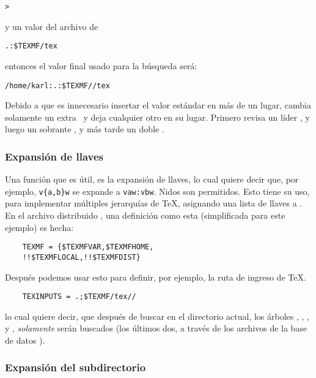 \documentclass{article}
\begin{document}
\begin{alltt}
	> 
\end{alltt}
y un valor  del archivo  de

\begin{alltt}
	.:\$TEXMF/tex
\end{alltt}
entonces el valor final usado para la búsqueda será:

\begin{alltt}
	/home/karl:.:\$TEXMF//tex
\end{alltt}

Debido a que es innecesario insertar el valor estándar en más
de un lugar, \KPS{} cambia solamente un extra \samp{:}\ y deja
cualquier otro en su lugar. Primero revisa un líder \samp{:},
y luego un sobrante \samp{:}, y más tarde un doble \samp{:}.

\subsubsection{Expansión de llaves}
\label{sec:brace-expansion}

Una función que es útil, es la expansión de 
llaves, lo cual quiere decir que, por ejemplo,
\verb+v{a,b}w+ se expande a \verb+vaw:vbw+. Nidos son
permitidos. Esto tiene su uso, para implementar múltiples
jerarquías de \TeX{}, asignando una lista de llaves a
.
En el archivo distribuido , una definición
como esta (simplificada para este ejemplo) es hecha:
\begin{verbatim}
	TEXMF = {$TEXMFVAR,$TEXMFHOME,
	!!$TEXMFLOCAL,!!$TEXMFDIST}
\end{verbatim}
Después podemos usar esto para definir, por ejemplo, la ruta de
ingreso de \TeX{}. 
\begin{verbatim}
	TEXINPUTS = .;$TEXMF/tex//
\end{verbatim}

lo cual quiere decir, que después de buscar en el directorio
actual, los árboles ,
, , y
, \emph{solamente} serán buscados (los
últimos dos, a través de los archivos de la base de datos
). 

\subsubsection{Expansión del subdirectorio}
\label{sec:subdirectory-expnsion}
\end{document}
